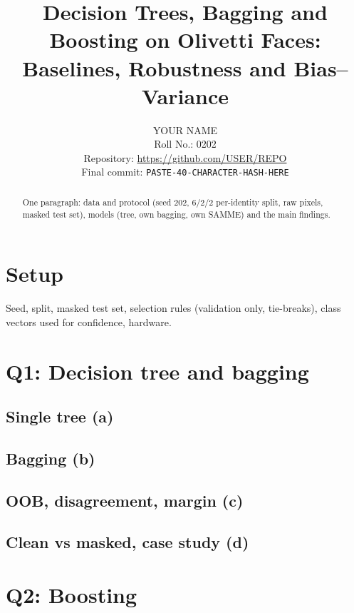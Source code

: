 \documentclass[10pt,twocolumn,letterpaper]{article}
\begin{document}
\title{Decision Trees, Bagging and Boosting on Olivetti Faces: Baselines, Robustness and Bias--Variance}

\author{YOUR NAME \\
Roll No.: 0202 \\
Repository: \url{https://github.com/USER/REPO} \\
Final commit: \texttt{PASTE-40-CHARACTER-HASH-HERE}}

\maketitle

\begin{abstract}
One paragraph: data and protocol (seed 202, 6/2/2 per-identity split, raw pixels, masked test set), models (tree, own bagging, own SAMME) and the main findings.
\end{abstract}

\section{Setup}
Seed, split, masked test set, selection rules (validation only, tie-breaks), class vectors used for confidence, hardware.

\section{Q1: Decision tree and bagging}
\subsection{Single tree (a)}   %
\subsection{Bagging (b)}       %
\subsection{OOB, disagreement, margin (c)}   %
\subsection{Clean vs masked, case study (d)} %

\section{Q2: Boosting}
\end{document}
